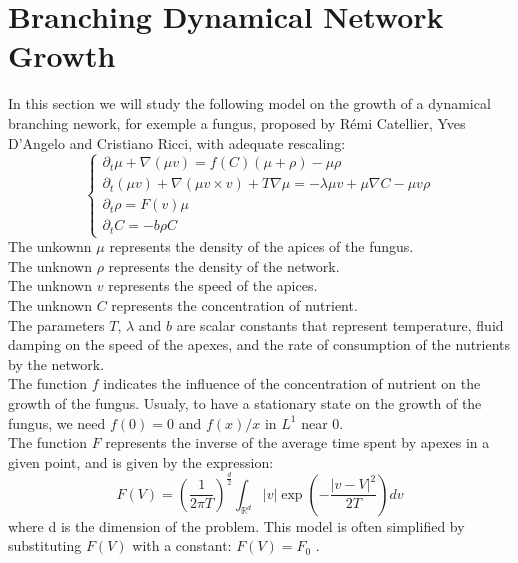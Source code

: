 \documentclass[17pt]{extarticle}
\newcommand{\dt}{\partial_t}
\begin{document}
\section{Branching Dynamical Network Growth}
In this section we will study the following model on the growth of a dynamical branching nework, for exemple a fungus, proposed by Rémi Catellier, Yves D'Angelo and Cristiano Ricci, with adequate rescaling:
\begin{equation}\label{eq:BDNG}  \left\{
                \begin{array}{ll}
                \dt\mu + \nabla(\mu v) = f(C)(\mu + \rho) -\mu\rho \\
                   \dt(\mu v)+\nabla(\mu v\times v) +T\nabla\mu=-\lambda\mu v+\mu\nabla C-\mu v \rho \\
                 \dt\rho=  F(v) \mu \\
                  \dt C = -b\rho C
                \end{array}
              \right.
\end{equation} 
The unkownn $\mu$ represents the density of the apices of the fungus.\\ The unknown $\rho$ represents the density of the network.\\
The unknown $v$ represents the speed of the apices.\\
The unknown $C$ represents the concentration of nutrient.\\
The parameters $T$, $\lambda$ and $b$ are scalar constants that represent temperature, fluid damping on the speed of the apexes, and the rate of consumption of the nutrients by the network.\\
The function $f$ indicates the influence of the concentration of nutrient on the growth of the fungus. Usualy, to have a stationary state on the growth of the fungus, we need $f(0)=0$ and $f(x)/x$ in $L^1$ near 0.\\
The function $F$ represents the inverse of the average time spent by apexes in a given point, and is given by the expression:
\begin{equation}
	F(V)=(\frac{1}{2\pi T})^\frac{d}{2}\int_{\mathbb{R}^d} |v|\exp(-\frac{|v-V|^2}{2T})dv\end{equation}
where d is the dimension of the problem. This model is often simplified by substituting $F(V)$ with a constant: $F(V)= F_0$ .\\
\newpage
\end{document}
